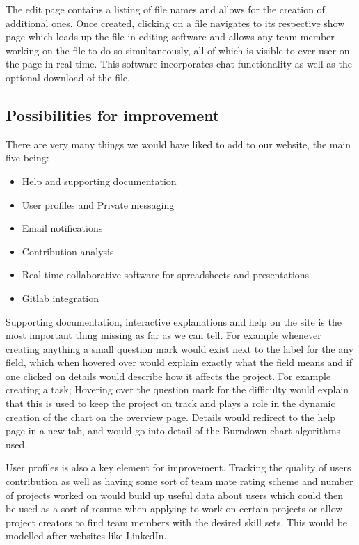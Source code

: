 \documentclass[a4wide, 11pt]{article}
\begin{document}
The edit page contains a listing of file names and allows for the creation of additional ones. Once created, clicking on a file navigates to its respective show page which loads up the file in editing software and allows any team member working on the file to do so simultaneously, all of which is visible to ever user on the page in real-time. This software incorporates chat functionality as well as the optional download of the file. 

\subsection{Possibilities for improvement}
There are very many things we would have liked to add to our website, the main five being:
\begin{itemize}
  \item Help and supporting documentation
  \item User profiles and Private messaging
  \item Email notifications
  \item Contribution analysis
  \item Real time collaborative software for spreadsheets and presentations
  \item Gitlab integration
\end{itemize}

Supporting documentation, interactive explanations and help on the site is the most important thing missing as far as we can tell. For example whenever creating anything a small question mark would exist next to the label for the any field, which when hovered over would explain exactly what the field means and if one clicked on details would describe how it affects the project. For example creating a task; Hovering over the question mark for the difficulty would explain that this is used to keep the project on track and plays a role in the dynamic creation of the chart on the overview page. Details would redirect to the help page in a new tab, and would go into detail of the Burndown chart algorithms used.

User profiles is also a key element for improvement. Tracking the quality of users contribution as well as having some sort of team mate rating scheme and number of projects worked on would build up useful data about users which could then be used as a sort of resume when applying to work on certain projects or allow project creators to find team members with the desired skill sets. This would be modelled after websites like LinkedIn.
\end{document}
